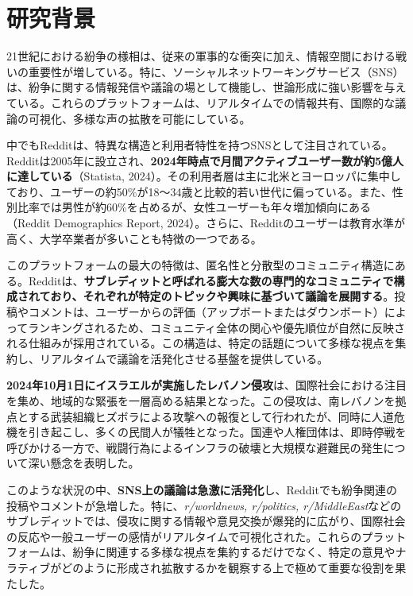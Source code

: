 \documentclass[11pt, a4j]{jreport}
\begin{document}
    \section{研究背景}

    21世紀における紛争の様相は、従来の軍事的な衝突に加え、情報空間における戦いの重要性が増している。特に、ソーシャルネットワーキングサービス（SNS）は、紛争に関する情報発信や議論の場として機能し、世論形成に強い影響を与えている。これらのプラットフォームは、リアルタイムでの情報共有、国際的な議論の可視化、多様な声の拡散を可能にしている。

    中でもRedditは、特異な構造と利用者特性を持つSNSとして注目されている。Redditは2005年に設立され、\textbf{2024年時点で月間アクティブユーザー数が約5億人に達している}（Statista, 2024）。その利用者層は主に北米とヨーロッパに集中しており、ユーザーの約50\%が18～34歳と比較的若い世代に偏っている。また、性別比率では男性が約60\%を占めるが、女性ユーザーも年々増加傾向にある（Reddit Demographics Report, 2024）。さらに、Redditのユーザーは教育水準が高く、大学卒業者が多いことも特徴の一つである。

    このプラットフォームの最大の特徴は、匿名性と分散型のコミュニティ構造にある。Redditは、\textbf{サブレディットと呼ばれる膨大な数の専門的なコミュニティで構成されており、それぞれが特定のトピックや興味に基づいて議論を展開する}。投稿やコメントは、ユーザーからの評価（アップボートまたはダウンボート）によってランキングされるため、コミュニティ全体の関心や優先順位が自然に反映される仕組みが採用されている。この構造は、特定の話題について多様な視点を集約し、リアルタイムで議論を活発化させる基盤を提供している。

    \textbf{2024年10月1日にイスラエルが実施したレバノン侵攻}は、国際社会における注目を集め、地域的な緊張を一層高める結果となった。この侵攻は、南レバノンを拠点とする武装組織ヒズボラによる攻撃への報復として行われたが、同時に人道危機を引き起こし、多くの民間人が犠牲となった。国連や人権団体は、即時停戦を呼びかける一方で、戦闘行為によるインフラの破壊と大規模な避難民の発生について深い懸念を表明した。

    このような状況の中、\textbf{SNS上の議論は急激に活発化}し、Redditでも紛争関連の投稿やコメントが急増した。特に、\textit{r/worldnews, r/politics, r/MiddleEast}などのサブレディットでは、侵攻に関する情報や意見交換が爆発的に広がり、国際社会の反応や一般ユーザーの感情がリアルタイムで可視化された。これらのプラットフォームは、紛争に関連する多様な視点を集約するだけでなく、特定の意見やナラティブがどのように形成され拡散するかを観察する上で極めて重要な役割を果たした。
\end{document}
